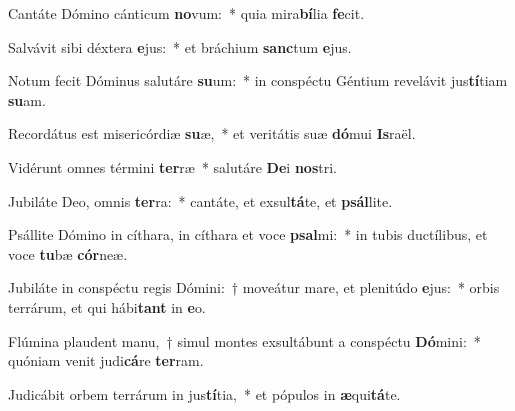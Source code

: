 \item Cantáte Dómino cánticum \textbf{no}vum:~* quia mira\textbf{bí}lia \textbf{fe}cit.
\item Salvávit sibi déxtera \textbf{e}jus:~* et bráchium \textbf{sanc}tum \textbf{e}jus.
\item Notum fecit Dóminus salutáre \textbf{su}um:~* in conspéctu Géntium revelávit jus\textbf{tí}tiam \textbf{su}am.
\item Recordátus est misericórdiæ \textbf{su}æ,~* et veritátis suæ \textbf{dó}mui \textbf{Is}raël.
\item Vidérunt omnes términi \textbf{ter}ræ~* salutáre \textbf{De}i \textbf{nos}tri.
\item Jubiláte Deo, omnis \textbf{ter}ra:~* cantáte, et exsul\textbf{tá}te, et \textbf{psál}lite.
\item Psállite Dómino in cíthara, in cíthara et voce \textbf{psal}mi:~* in tubis ductílibus, et voce \textbf{tu}bæ \textbf{cór}neæ.
\item Jubiláte in conspéctu regis Dómini:~† moveátur mare, et plenitúdo \textbf{e}jus:~* orbis terrárum, et qui hábi\textbf{tant} in \textbf{e}o.
\item Flúmina plaudent manu,~† simul montes exsultábunt a conspéctu \textbf{Dó}mini:~* quóniam venit judi\textbf{cá}re \textbf{ter}ram.
\item Judicábit orbem terrárum in jus\textbf{tí}tia,~* et pópulos in \textbf{æ}qui\textbf{tá}te.

